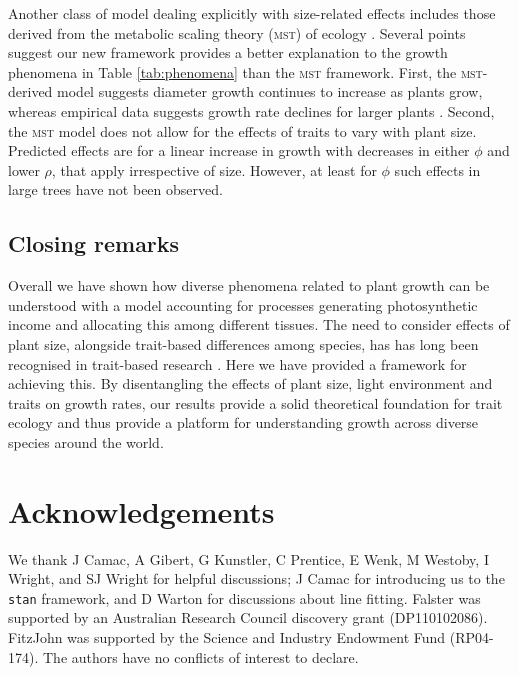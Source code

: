 \documentclass[a4paper,11pt]{article}
\begin{document}
Another class of model dealing explicitly with size-related effects includes those derived from the metabolic scaling theory (\textsc{mst}) of ecology \citep{Enquist-1999, Enquist-2007}. Several points suggest our new framework provides a better explanation to the growth phenomena in Table \ref{tab:phenomena} than the \textsc{mst} framework. First, the \textsc{mst}-derived model suggests diameter growth continues to increase as plants grow, whereas empirical data suggests growth rate declines for larger plants \citep{Herault-2011}. Second, the \textsc{mst} model does not allow for the effects of traits to vary with plant size. Predicted effects are for a linear increase in growth with decreases in either $\phi$ and lower $\rho$, that apply irrespective of size. However, at least for $\phi$ such effects in large trees have not been observed.

\subsection{Closing remarks}

Overall we have shown how diverse phenomena related to plant growth can be understood with a model accounting for processes generating photosynthetic income and allocating this among different tissues. The need to consider effects of plant size, alongside trait-based differences among species, has has long been recognised in trait-based research \cite[e.g.][]{Givnish-1988, Thomas-1999, Moorcroft-2001, Westoby-2002, Enquist-2007}. Here we have provided a framework for achieving this. By disentangling the effects of plant size, light environment and traits on growth rates, our results provide a solid theoretical foundation for trait ecology and thus provide a platform for understanding growth across diverse species around the world.

\section{Acknowledgements}

We thank J Camac, A Gibert, G Kunstler, C Prentice, E Wenk, M Westoby, I Wright, and SJ Wright for helpful discussions; J Camac for introducing us to the \texttt{stan} framework, and D Warton for discussions about {\sma} line fitting. Falster was supported by an Australian Research Council discovery grant (DP110102086). FitzJohn was supported by the Science and Industry Endowment Fund (RP04-174). The authors have no conflicts of interest to declare.
\end{document}
